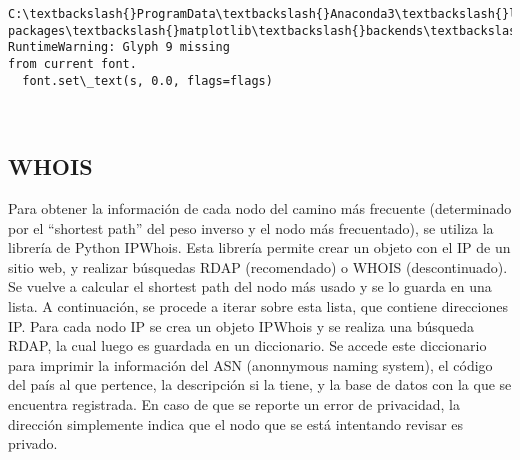 \documentclass[11pt]{article}
\begin{document}
    \begin{Verbatim}[commandchars=\\\{\}]
C:\textbackslash{}ProgramData\textbackslash{}Anaconda3\textbackslash{}lib\textbackslash{}site-
packages\textbackslash{}matplotlib\textbackslash{}backends\textbackslash{}backend\_agg.py:211: RuntimeWarning: Glyph 9 missing
from current font.
  font.set\_text(s, 0.0, flags=flags)
    \end{Verbatim}

    \begin{center}
    \end{center}
    { \hspace*{\fill} \\}
    
    \hypertarget{whois}{%
\subsection{WHOIS}\label{whois}}

Para obtener la información de cada nodo del camino más frecuente
(determinado por el ``shortest path'' del peso inverso y el nodo más
frecuentado), se utiliza la librería de Python IPWhois. Esta librería
permite crear un objeto con el IP de un sitio web, y realizar búsquedas
RDAP (recomendado) o WHOIS (descontinuado). Se vuelve a calcular el
shortest path del nodo más usado y se lo guarda en una lista. A
continuación, se procede a iterar sobre esta lista, que contiene
direcciones IP. Para cada nodo IP se crea un objeto IPWhois y se realiza
una búsqueda RDAP, la cual luego es guardada en un diccionario. Se
accede este diccionario para imprimir la información del ASN (anonnymous
naming system), el código del país al que pertence, la descripción si la
tiene, y la base de datos con la que se encuentra registrada. En caso de
que se reporte un error de privacidad, la dirección simplemente indica
que el nodo que se está intentando revisar es privado.
\end{document}
